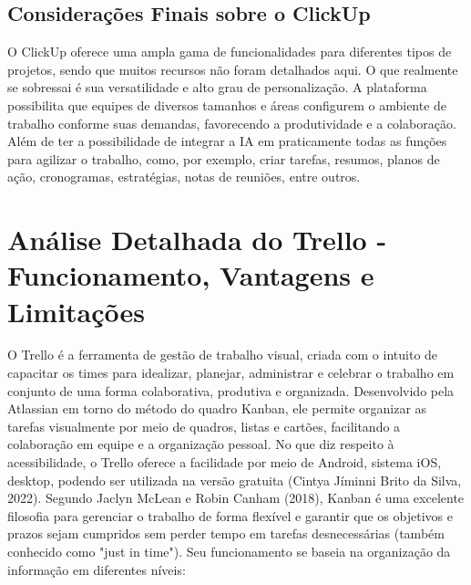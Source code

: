\documentclass[12pt]{article}
\begin{document}
\subsection{Considerações Finais sobre o ClickUp}
O ClickUp oferece uma ampla gama de funcionalidades para diferentes tipos de projetos, sendo que muitos recursos não foram detalhados aqui. O que realmente se sobressai é sua versatilidade e alto grau de personalização. A plataforma possibilita que equipes de diversos tamanhos e áreas configurem o ambiente de trabalho conforme suas demandas, favorecendo a produtividade e a colaboração.
Além de ter a possibilidade de integrar a IA em praticamente todas as funções para agilizar o trabalho, como, por exemplo, criar tarefas, resumos, planos de ação, cronogramas, estratégias, notas de reuniões, entre outros.

\section{Análise Detalhada do Trello - Funcionamento, Vantagens e Limitações}
O Trello é a ferramenta de gestão de trabalho visual, criada com o intuito de capacitar os times para idealizar, planejar, administrar e celebrar o trabalho em conjunto de uma forma colaborativa, produtiva e organizada. Desenvolvido pela Atlassian em torno do método do quadro Kanban, ele
permite organizar as tarefas visualmente por meio de quadros, listas e cartões, facilitando a colaboração em equipe e a organização pessoal. No que diz respeito à acessibilidade, o Trello oferece a facilidade por meio de Android, sistema iOS, desktop, podendo ser utilizada na versão gratuita (Cintya Jíminni Brito da Silva, 2022).
Segundo Jaclyn McLean e Robin Canham (2018), Kanban é uma excelente filosofia para gerenciar o trabalho de forma flexível e garantir que os objetivos e prazos sejam cumpridos sem perder tempo em tarefas desnecessárias (também conhecido como "just in time").
Seu funcionamento se baseia na organização da informação em diferentes níveis:
\end{document}
